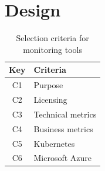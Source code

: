 
\section{Design}


\begin{table}[]
\begin{tabular}{c|l}
Key & Criteria \\
\hline
C1 & Purpose \\
C2 & Licensing \\
C3 & Technical metrics \\
C4 & Business metrics \\
C5 & Kubernetes \\
C6 & Microsoft Azure \\
\end{tabular}
\caption{Selection criteria for monitoring tools}
\label{tab:monitoring_tool_criteria}
\end{table}


